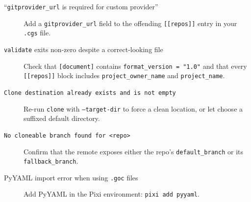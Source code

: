 \begin{description}
  \item[``\texttt{gitprovider\_url} is required for custom provider'']
    Add a \texttt{gitprovider\_url} field to the offending
    \texttt{[[repos]]} entry in your \texttt{.cgs} file.
  \item[\texttt{validate} exits non-zero despite a correct-looking file]
    Check that \texttt{[document]} contains \texttt{format\_version = "1.0"}
    and that every \texttt{[[repos]]} block includes
    \texttt{project\_owner\_name} and \texttt{project\_name}.
  \item[\texttt{Clone destination already exists and is not empty}]
    Re-run \texttt{clone} with \texttt{--target-dir} to force a clean location,
    or let \cgscli{} choose a suffixed default directory.
  \item[\texttt{No cloneable branch found for <repo>}]
    Confirm that the remote exposes either the repo's
    \texttt{default\_branch} or its \texttt{fallback\_branch}.
  \item[PyYAML import error when using \texttt{.goc} files]
    Add PyYAML in the Pixi environment: \texttt{pixi add pyyaml}.
\end{description}

